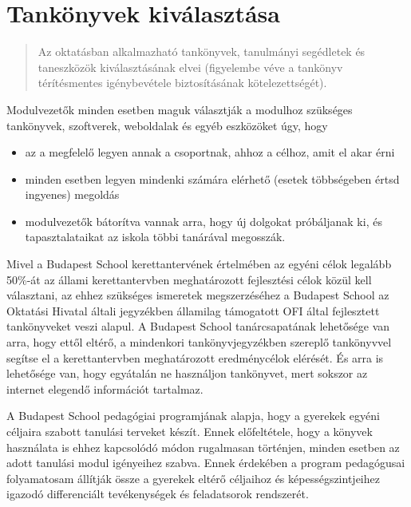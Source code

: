 \section{Tankönyvek
kiválasztása}\label{tankuxf6nyvek-kivuxe1lasztuxe1sa}

\begin{quote}
Az oktatásban alkalmazható tankönyvek, tanulmányi segédletek és
taneszközök kiválasztásának elvei (figyelembe véve a tankönyv
térítésmentes igénybevétele biztosításának kötelezettségét).
\end{quote}

Modulvezetők minden esetben maguk választják a modulhoz szükséges
tankönyvek, szoftverek, weboldalak és egyéb eszközöket úgy, hogy

\begin{itemize}

\item
  az a megfelelő legyen annak a csoportnak, ahhoz a célhoz, amit el akar
  érni
\item
  minden esetben legyen mindenki számára elérhető (esetek többségeben
  értsd ingyenes) megoldás
\item
  modulvezetők bátorítva vannak arra, hogy új dolgokat próbáljanak ki,
  és tapasztalataikat az iskola többi tanárával megosszák.
\end{itemize}

Mivel a Budapest School kerettantervének értelmében az egyéni célok
legalább 50\%-át az állami kerettantervben meghatározott fejlesztési
célok közül kell választani, az ehhez szükséges ismeretek megszerzéséhez
a Budapest School az Oktatási Hivatal általi jegyzékben államilag
támogatott OFI által fejlesztett tankönyveket veszi alapul. A Budapest
School tanárcsapatának lehetősége van arra, hogy ettől eltérő, a
mindenkori tankönyvjegyzékben szereplő tankönyvvel segítse el a
kerettantervben meghatározott eredménycélok elérését. És arra is
lehetősége van, hogy egyátalán ne használjon tankönyvet, mert sokszor az
internet elegendő információt tartalmaz.

A Budapest School pedagógiai programjának alapja, hogy a gyerekek egyéni
céljaira szabott tanulási terveket készít. Ennek előfeltétele, hogy a
könyvek használata is ehhez kapcsolódó módon rugalmasan történjen,
minden esetben az adott tanulási modul igényeihez szabva. Ennek
érdekében a program pedagógusai folyamatosam állítják össze a gyerekek
eltérő céljaihoz és képességszintjeihez igazodó differenciált
tevékenységek és feladatsorok rendszerét.

